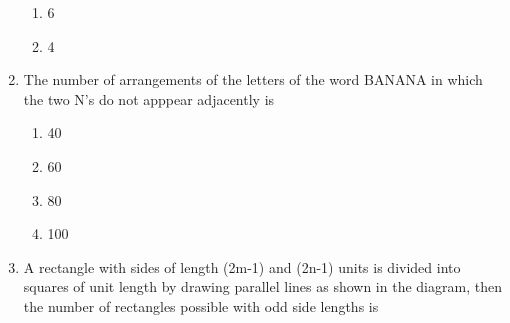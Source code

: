 \begin{enumerate}[label=\arabic*.,ref=\thesubsection.\theenumi]
\begin{enumerate}
\item 6
\item 4\\
\end{enumerate}
\item The number of arrangements of the letters of the word BANANA in which the two N's do not apppear adjacently is
\begin{enumerate}
\item 40
\item 60
\item 80
\item 100\\
\end{enumerate}
\item A rectangle with sides of length (2m-1) and (2n-1) units is divided into squares of unit length by drawing parallel lines as shown in the diagram, then the number of rectangles possible with odd side lengths is


\end{enumerate}
